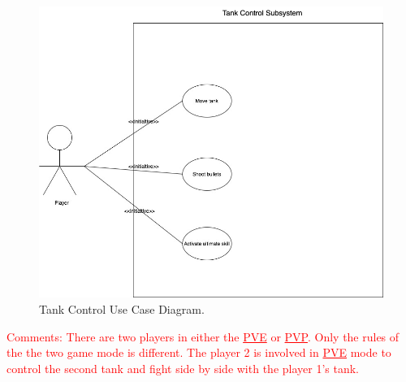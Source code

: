 \documentclass[12pt, titlepage]{article}
\begin{document}
\begin{figure}[H]
  \includegraphics[width=0.9\linewidth]{TC.jpg}
  \caption{Tank Control Use Case Diagram.}
  \label{fig:tank control use case2}
\end{figure}

\textcolor{red}{Comments: There are two players in either the \underline{PVE} or \underline{PVP}. Only the rules of the the two game mode is different. The player 2 is involved in \underline{PVE} mode to control the second tank and fight side by side with the player 1's tank.}
\end{document}
